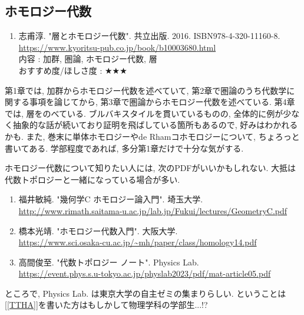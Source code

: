 \documentclass[10pt,a4paper]{jsarticle}
\begin{document}
\subsection{ホモロジー代数}
    \begin{enumerate}
        \renewcommand{\theenumi}{[HA\arabic{enumi}]}
        \renewcommand{\labelenumi}{\theenumi}
        \setcounter{enumi}{0}
        \item \label{SJHA} 志甫淳. "層とホモロジー代数". 共立出版. 2016. ISBN978-4-320-11160-8. \\
        \url{https://www.kyoritsu-pub.co.jp/book/b10003680.html} \\
        内容 : 加群, 圏論, ホモロジー代数, 層\\
        おすすめ度/ほしさ度 : $\bigstar \bigstar \bigstar $ 
    \end{enumerate}\par
    第1章では, 加群からホモロジー代数を述べていて, 第2章で圏論のうち代数学に関する事項を論じてから, 第3章で圏論からホモロジー代数を述べている. 第4章では, 層をのべている. ブルバキスタイルを貫いているものの, 全体的に例が少なく抽象的な話が続いており証明を飛ばしている箇所もあるので, 好みはわかれるかも. また, 巻末に単体ホモロジーやde Rhamコホモロジーについて, ちょろっと書いてある. 学部程度であれば, 多分第1章だけで十分な気がする. \par
    ホモロジー代数について知りたい人には, 次のPDFがいいかもしれない. 大抵は代数トポロジーと一緒になっている場合が多い. 
    \begin{enumerate}
        \renewcommand{\theenumi}{\arabic{enumi}}
        \renewcommand{\labelenumi}{[\theenumi]}
        \setcounter{enumi}{3}
        \item \label{FTHA} 福井敏純. "幾何学C ホモロジー論入門". 埼玉大学. \\
        \url{http://www.rimath.saitama-u.ac.jp/lab.jp/Fukui/lectures/GeometryC.pdf} 
        \item \label{HMHA} 橋本光靖. "ホモロジー代数入門". 大阪大学. \\
        \url{https://www.sci.osaka-cu.ac.jp/~mh/paper/class/homology14.pdf} 
        \item \label{TTHA} 高間俊至. "代数トポロジー ノート". Physics Lab. \\
        \url{https://event.phys.s.u-tokyo.ac.jp/physlab2023/pdf/mat-article05.pdf} 
    \end{enumerate}
    ところで, Physics Lab. は東京大学の自主ゼミの集まりらしい. ということは[\ref{TTHA}]を書いた方はもしかして物理学科の学部生...!?
\end{document}
